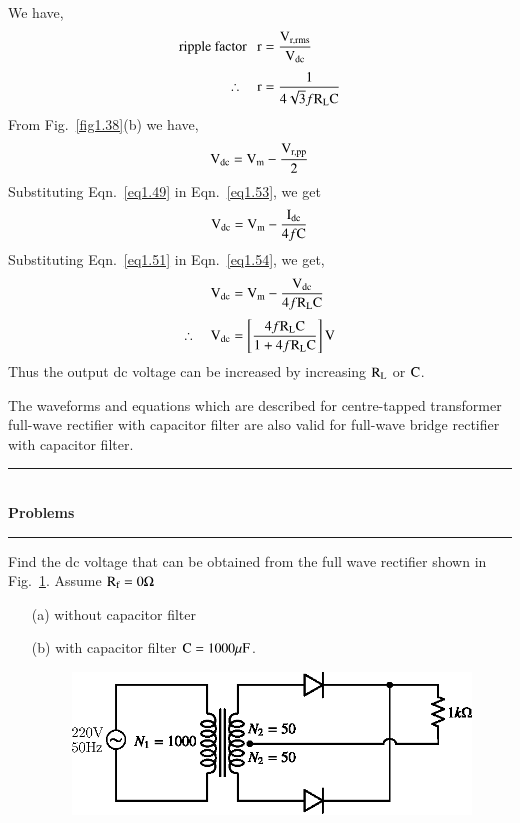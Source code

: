 We have,
\begin{align}
\text{ripple factor~~ } \textrm{r} &= \frac{\textrm{V}_{\text{r,rms}}}{\textrm{V}_{\text{dc}}}\notag\\[3pt]
\therefore\quad \textrm{r} &= \frac{1}{4\sqrt{3}f\textrm{R}_{\textrm{L}}\textrm{C}}\label{eq1.52}
\end{align}
From Fig.~\ref{fig1.38}(b) we have,
\begin{equation}
\textrm{V}_{\text{dc}}=\textrm{V}_{\textrm{m}}-\frac{\textrm{V}_{\text{r,pp}}}{2}\label{eq1.53}
\end{equation}
Substituting Eqn.~\eqref{eq1.49} in Eqn.~\eqref{eq1.53}, we get
\begin{equation}
\textrm{V}_{\text{dc}}=\textrm{V}_{\textrm{m}}-\frac{\textrm{I}_{\text{dc}}}{4f\textrm{C}}\label{eq1.54}
\end{equation}
Substituting Eqn.~\eqref{eq1.51} in Eqn.~\eqref{eq1.54}, we get,
\begin{align}
\textrm{V}_{\text{dc}} &= \textrm{V}_{\textrm{m}} - \frac{\textrm{V}_{\text{dc}}}{4f\textrm{R}_{\textrm{L}}\textrm{C}}\notag\\[3pt]
\therefore\quad \textrm{V}_{\text{dc}} &= \left[\frac{4f\textrm{R}_{\textrm{L}}\textrm{C}}{1+4f\textrm{R}_{\textrm{L}}\textrm{C}}\right]\textrm{V}_{\rm}\label{eq1.55}
\end{align}
Thus the output dc voltage can be increased by increasing $\textrm{R}_{\textrm{L}}$ or $\textrm{C}$.

\begin{note}
The waveforms and equations which are described for centre-tapped transformer full-wave rectifier with capacitor filter are also valid for full-wave bridge rectifier with capacitor filter.
\end{note}

\begin{center}
\rule{4cm}{1pt}\\
{\bf\Large Problems}\\[-3pt]
\rule{4cm}{1pt}
\end{center}

\begin{problem}\label{prob1.1}
Find the dc voltage that can be obtained from the full wave rectifier shown in Fig.~\ref{fig1.42}. Assume $\textrm{R}_{\textrm{f}}=0\Omega$
\begin{itemize}
\item[(a)] without capacitor filter

\item[(b)] with capacitor filter $\textrm{C}=1000\mu\textrm{F}$.
\begin{figure}[H]
\centering
\includegraphics{chap1/fig1.42.eps}
\caption{}\label{fig1.42}
\end{figure}
\end{itemize}
\end{problem}

